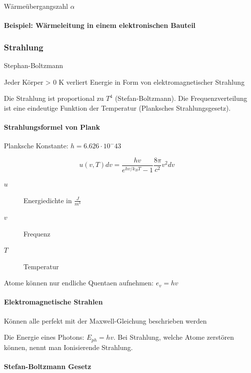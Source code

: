 \documentclass[a4paper]{scrartcl}
\begin{document}
Wärmeübergangszahl $\alpha$

\paragraph{Beispiel: Wärmeleitung in einem elektronischen Bauteil}




\subsubsection{Strahlung}
Stephan-Boltzmann


Jeder Körper > 0 K verliert Energie in Form von elektromagnetischer Strahlung

Die Strahlung ist proportional zu $T^4$ (Stefan-Boltzmann). Die Frequenzverteilung ist eine eindeutige Funktion der Temperatur (Planksches Strahlungsgesetz).

\paragraph{Strahlungsformel von Plank}

Planksche Konstante: $h = 6.626 \cdot 10^-43$

\[
	u(v,T)dv = \frac{hv}{e^{hv/k_BT} - 1} \frac{8\pi}{c^2} v^2 dv
\]

\begin{description}
	\item[$u$] Energiedichte in $\frac{J}{m^3}$
	\item[$v$] Frequenz
	\item[$T$] Temperatur
\end{description}

Atome können nur endliche Quentaen aufnehmen: $e_v = hv$


\paragraph{Elektromagnetische Strahlen}

Können alle perfekt mit der Maxwell-Gleichung beschrieben werden


Die Energie eines Photons: $E_{ph} = hv$. Bei Strahlung, welche Atome zerstören können, nennt man Ionisierende Strahlung.




\paragraph{Stefan-Boltzmann Gesetz}
\end{document}
